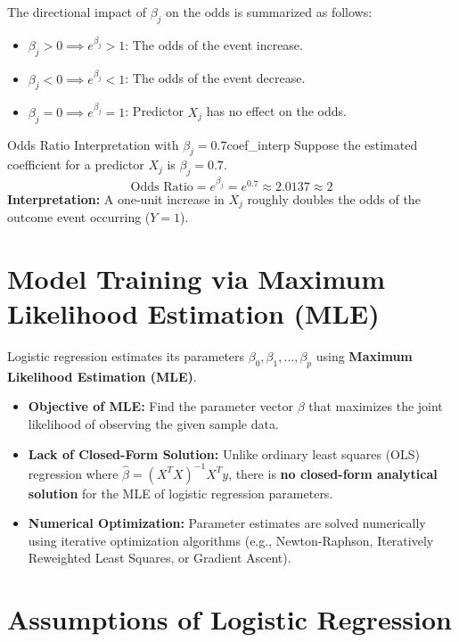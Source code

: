 The directional impact of $\beta_j$ on the odds is summarized as follows:
\begin{itemize}
    \item $\beta_j > 0 \implies e^{\beta_j} > 1$: The odds of the event increase.
    \item $\beta_j < 0 \implies e^{\beta_j} < 1$: The odds of the event decrease.
    \item $\beta_j = 0 \implies e^{\beta_j} = 1$: Predictor $X_j$ has no effect on the odds.
\end{itemize}

\begin{example}{Odds Ratio Interpretation with $\beta_j = 0.7$}{coef_interp}
Suppose the estimated coefficient for a predictor $X_j$ is $\beta_j = 0.7$.
\begin{equation}
\text{Odds Ratio} = e^{\beta_j} = e^{0.7} \approx 2.0137 \approx 2
\end{equation}
\textbf{Interpretation:} A one-unit increase in $X_j$ roughly doubles the odds of the outcome event occurring ($Y=1$).
\end{example}

\section{Model Training via Maximum Likelihood Estimation (MLE)}

Logistic regression estimates its parameters $\beta_0, \beta_1, \dots, \beta_p$ using \textbf{Maximum Likelihood Estimation (MLE)}. 
\begin{itemize}
    \item \textbf{Objective of MLE:} Find the parameter vector $\beta$ that maximizes the joint likelihood of observing the given sample data.
    \item \textbf{Lack of Closed-Form Solution:} Unlike ordinary least squares (OLS) regression where $\hat{\beta} = (X^T X)^{-1} X^T y$, there is \textbf{no closed-form analytical solution} for the MLE of logistic regression parameters.
    \item \textbf{Numerical Optimization:} Parameter estimates are solved numerically using iterative optimization algorithms (e.g., Newton-Raphson, Iteratively Reweighted Least Squares, or Gradient Ascent).
\end{itemize}

\section{Assumptions of Logistic Regression}

